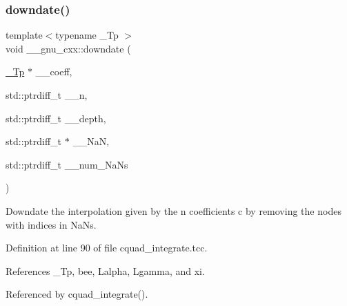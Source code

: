 \subsubsection{\texorpdfstring{downdate()}{downdate()}}
{\footnotesize\ttfamily template$<$typename \+\_\+\+Tp $>$ \\
void \+\_\+\+\_\+gnu\+\_\+cxx\+::downdate (\begin{DoxyParamCaption}\item[{\hyperlink{namespace____gnu__cxx_a3b19a9c800ca194374ef9172290f7d79}{\+\_\+\+Tp} $\ast$}]{\+\_\+\+\_\+coeff,  }\item[{std\+::ptrdiff\+\_\+t}]{\+\_\+\+\_\+n,  }\item[{std\+::ptrdiff\+\_\+t}]{\+\_\+\+\_\+depth,  }\item[{std\+::ptrdiff\+\_\+t $\ast$}]{\+\_\+\+\_\+\+NaN,  }\item[{std\+::ptrdiff\+\_\+t}]{\+\_\+\+\_\+num\+\_\+\+Na\+Ns }\end{DoxyParamCaption})}

Downdate the interpolation given by the n coefficients c by removing the nodes with indices in Na\+Ns. 

Definition at line 90 of file cquad\+\_\+integrate.\+tcc.



References \+\_\+\+Tp, bee, Lalpha, Lgamma, and xi.



Referenced by cquad\+\_\+integrate().


